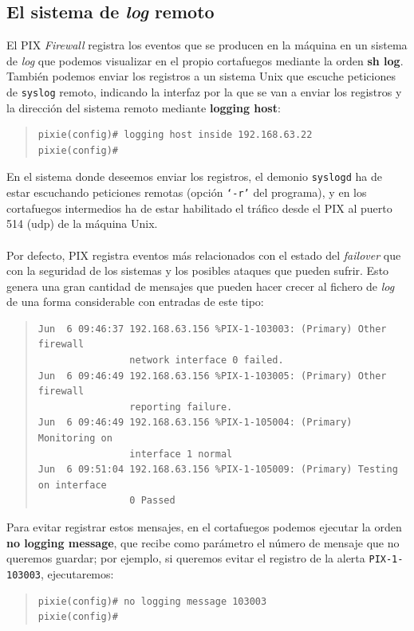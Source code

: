 \subsection{El sistema de {\it log} remoto}
El PIX {\it Firewall} registra los eventos que se producen en la m\'aquina en 
un sistema de {\it log} que podemos visualizar en el propio cortafuegos 
mediante la orden {\bf sh log}. Tambi\'en podemos enviar los registros a un
sistema Unix que escuche peticiones de {\tt syslog} remoto, indicando la 
interfaz por la que se van a enviar los registros y la direcci\'on del sistema 
remoto mediante {\bf logging host}:
\begin{quote}
\begin{verbatim}
pixie(config)# logging host inside 192.168.63.22
pixie(config)# 
\end{verbatim}
\end{quote}
En el sistema donde deseemos enviar los registros, el demonio {\tt syslogd} ha 
de estar escuchando peticiones remotas (opci\'on {\tt `-r'} del programa), y
en los cortafuegos intermedios ha de estar habilitado el tr\'afico desde el
PIX al puerto 514 ({\sc udp}) de la m\'aquina Unix.\\
\\Por defecto, PIX registra eventos m\'as relacionados con el estado del {\it
failover} que con la seguridad de los sistemas y los posibles ataques que 
pueden sufrir. Esto genera una gran cantidad de mensajes que pueden hacer 
crecer al fichero de {\it log} de una forma considerable con entradas de este
tipo:
\begin{quote}
\begin{verbatim}
Jun  6 09:46:37 192.168.63.156 %PIX-1-103003: (Primary) Other firewall 
                network interface 0 failed.
Jun  6 09:46:49 192.168.63.156 %PIX-1-103005: (Primary) Other firewall 
                reporting failure. 
Jun  6 09:46:49 192.168.63.156 %PIX-1-105004: (Primary) Monitoring on 
                interface 1 normal
Jun  6 09:51:04 192.168.63.156 %PIX-1-105009: (Primary) Testing on interface 
                0 Passed
\end{verbatim}
\end{quote}
Para evitar registrar estos mensajes, en el cortafuegos podemos ejecutar la
orden {\bf no logging message}, que recibe como par\'ametro el n\'umero de 
mensaje que no queremos guardar; por ejemplo, si queremos evitar el registro de
la alerta {\tt PIX-1-103003}, ejecutaremos:
\begin{quote}
\begin{verbatim}
pixie(config)# no logging message 103003
pixie(config)# 
\end{verbatim}
\end{quote}
